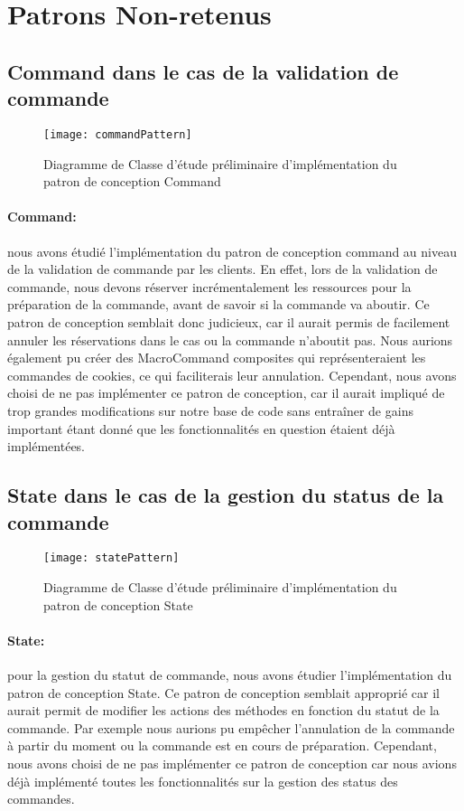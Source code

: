 \section{Patrons Non-retenus}
\subsection{Command dans le cas de la validation de commande}

\begin{figure}[!ht]
\texttt{[image: commandPattern]}
\centering
\caption{Diagramme de Classe d'étude préliminaire d'implémentation du patron de conception Command}
\label{uml:command}
\end{figure}

\paragraph{Command: } nous avons étudié l'implémentation du patron de conception command au niveau 
de la validation de commande par les clients. En effet, lors de la validation de commande, nous devons réserver
incrémentalement les ressources pour la préparation de la commande, avant de savoir si la commande va aboutir.
Ce patron de conception semblait donc judicieux, car il aurait permis de facilement annuler les réservations dans 
le cas ou la commande n'aboutit pas. Nous aurions également pu créer des MacroCommand composites qui représenteraient 
les commandes de cookies, ce qui faciliterais leur annulation.
Cependant, nous avons choisi de ne pas implémenter ce patron de conception, car il aurait impliqué de trop grandes modifications 
sur notre base de code sans entraîner de gains important étant donné que les fonctionnalités en question étaient déjà implémentées.

\subsection{State dans le cas de la gestion du status de la commande}

\begin{figure}[!ht]
\texttt{[image: statePattern]}
\centering
\caption{Diagramme de Classe d'étude préliminaire d'implémentation du patron de conception State}
\label{uml:state}
\end{figure}

\paragraph{State: } pour la gestion du statut de commande, nous avons étudier 
l'implémentation du patron de conception State. Ce patron de conception semblait approprié car
il aurait permit de modifier les actions des méthodes en fonction du statut de la commande. Par exemple
nous aurions pu empêcher l'annulation de la commande à partir du moment ou la commande est en cours de préparation.
Cependant, nous avons choisi de ne pas implémenter ce patron de conception car nous avions déjà implémenté 
toutes les fonctionnalités sur la gestion des status des commandes.
